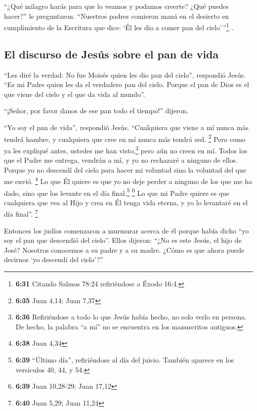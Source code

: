  ``¿Qué milagro harás para que lo veamos y podamos
creerte? ¿Qué puedes hacer?'' le preguntaron.  ``Nuestros
padres comieron maná en el desierto en cumplimiento de la Escritura que
dice: `Él les dio a comer pan del cielo'\,''\footnote{\textbf{6:31}
  Citando Salmos 78:24 refiriéndose a Éxodo 16:4.} .

\hypertarget{el-discurso-de-jesuxfas-sobre-el-pan-de-vida}{%
\subsection{El discurso de Jesús sobre el pan de
vida}\label{el-discurso-de-jesuxfas-sobre-el-pan-de-vida}}

 ``Les diré la verdad: No fue Moisés quien les dio pan
del cielo'', respondió Jesús. ``Es mi Padre quien les da el verdadero
pan del cielo.  Porque el pan de Dios es el que viene del
cielo y el que da vida al mundo''.

 ``¡Señor, por favor danos de ese pan todo el tiempo!''
dijeron.

 ``Yo soy el pan de vida'', respondió Jesús. ``Cualquiera
que viene a mí nunca más tendrá hambre, y cualquiera que cree en mí
nunca más tendrá sed. \footnote{\textbf{6:35} Juan 4,14; Juan 7,37}
 Pero como ya les expliqué antes, ustedes me han
visto,\footnote{\textbf{6:36} Refiriéndose a todo lo que Jesús había
  hecho, no solo verlo en persona. De hecho, la palabra ``a mí'' no se
  encuentra en los manuscritos antiguos.} pero aún no creen en mí.
 Todos los que el Padre me entrega, vendrán a mí, y yo no
rechazaré a ninguno de ellos.  Porque yo no descendí del
cielo para hacer mi voluntad sino la voluntad del que me envió.
\footnote{\textbf{6:38} Juan 4,34}  Lo que Él quiere es
que yo no deje perder a ninguno de los que me ha dado, sino que los
levante en el día final.\footnote{\textbf{6:39} ``Último día'',
  refiriéndose al día del juicio. También aparece en los versículos 40,
  44, y 54.} \footnote{\textbf{6:39} Juan 10,28-29; Juan 17,12}
 Lo que mi Padre quiere es que cualquiera que vea al Hijo
y crea en Él tenga vida eterna, y yo lo levantaré en el día final''.
\footnote{\textbf{6:40} Juan 5,29; Juan 11,24}

 Entonces los judíos comenzaron a murmurar acerca de él
porque había dicho ``yo soy el pan que descendió del cielo''.
 Ellos dijeron: ``¿No es este Jesús, el hijo de José?
Nosotros conocemos a su padre y a su madre. ¿Cómo es que ahora puede
decirnos `yo descendí del cielo'?''

